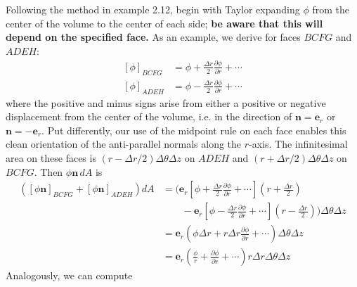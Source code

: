 \documentclass[a4paper]{article}
\begin{document}
Following the method in example 2.12, begin with Taylor expanding \( \phi \) from the center of the volume to the center of each side; \textbf{be aware that this will depend on the specified face.} As an example, we derive for faces \( BCFG \) and \( ADEH \):
\begin{align*}
	\!\left[ \phi \right]_{BCFG} & = \phi + \frac{\Delta r}{2}\frac{\partial \phi}{\partial r} + \cdots \\
	\!\left[ \phi \right]_{ADEH} & = \phi - \frac{\Delta r}{2}\frac{\partial \phi}{\partial r} + \cdots
\end{align*}
where the positive and minus signs arise from either a positive or negative displacement from the center of the volume, i.e. in the direction of \( \pmb{n} = \pmb{e}_{r} \) or \( \pmb{n} = -\pmb{e}_{r} \). Put differently, our use of the midpoint rule on each face enables this clean orientation of the anti-parallel normals along the \( r \)-axis. The infinitesimal area on these faces is \( \!\left( r - \Delta r / 2 \right) \Delta \theta \Delta z \) on \( ADEH \) and \( \!\left( r + \Delta r / 2 \right)\Delta \theta \Delta z \) on \( BCFG \). Then \( \phi \pmb{n} \, dA \) is
\begin{align*}
	\!\left( \!\left[ \phi \pmb{n} \right]_{BCFG} + \!\left[ \phi \pmb{n} \right]_{ADEH} \right)dA & = \biggl( \pmb{e}_{r}\!\left[ \phi + \frac{\Delta r}{2}\frac{\partial \phi}{\partial r} + \cdots \right]\!\left( r + \frac{\Delta r}{2} \right) \\
												       & \qquad - \pmb{e}_{r} \!\left[ \phi - \frac{\Delta r}{2}\frac{\partial \phi}{\partial r} + \cdots \right]\!\left( r - \frac{\Delta r}{2} \right) \biggr) \Delta \theta \Delta z \\
												       & = \pmb{e}_{r}\!\left( \phi \Delta r + r \Delta r \frac{\partial \phi}{\partial r} + \cdots \right) \Delta \theta \Delta z \\
												       & = \pmb{e}_{r}\!\left( \frac{\phi}{r} + \frac{\partial \phi}{\partial r} + \cdots \right)r \Delta r \Delta \theta \Delta z
\end{align*}
Analogously, we can compute
\end{document}
